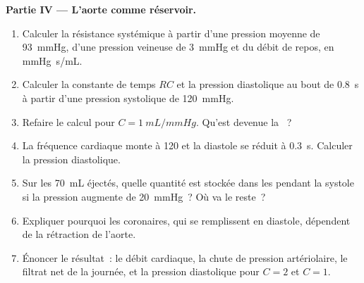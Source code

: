 \begin{problem}
\medskip
\noindent\textbf{Partie IV --- L'aorte comme réservoir.}
\begin{enumerate}[resume]
  \item Calculer la résistance systémique à partir d'une pression moyenne
        de \qty{93}{mmHg}, d'une pression veineuse de \qty{3}{mmHg} et du
        débit de repos, en \unit{mmHg.s/mL}.
  \item Calculer la constante de temps $RC$ et la pression diastolique au
        bout de \qty{0.8}{s} à partir d'une pression systolique de
        \qty{120}{mmHg}.
  \item Refaire le calcul pour $C = \qty{1}{mL/mmHg}$. Qu'est devenue la
        ~?
  \item La fréquence cardiaque monte à \num{120} et la diastole se réduit
        à \qty{0.3}{s}. Calculer la pression diastolique.
  \item Sur les \qty{70}{mL} éjectés, quelle quantité est stockée dans
        les  pendant la systole si la pression augmente de
        \qty{20}{mmHg}~? Où va le reste~?
  \item Expliquer pourquoi les  coronaires, qui se remplissent en
        diastole, dépendent de la rétraction de l'aorte.
  \item Énoncer le résultat~: le débit cardiaque, la chute de pression
        artériolaire, le filtrat net de la journée, et la pression
        diastolique pour $C = 2$ et $C = 1$.
\end{enumerate}
\end{problem}
